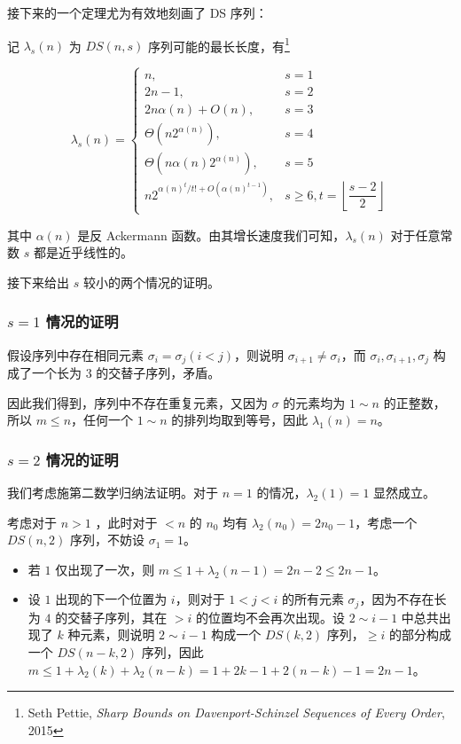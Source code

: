 \documentclass{noithesis}
\begin{document}
接下来的一个定理尤为有效地刻画了 DS 序列：

\begin{Thm}
记 $\lambda_s(n)$ 为 $DS(n, s)$ 序列可能的最长长度，有\footnote{Seth Pettie, \emph{Sharp Bounds on Davenport-Schinzel Sequences of Every Order}, 2015}

$$
\lambda_s(n) = \begin{cases}
n, & s = 1 \\
2n - 1, & s = 2\\
2n\alpha(n) + O(n), & s = 3\\
\Theta(n 2^{\alpha(n)}), & s = 4\\
\Theta(n\alpha(n) 2^{\alpha(n)}), & s = 5\\
n2^{\alpha(n)^t/t! + O(\alpha(n)^{t-1})}, & s\ge 6, t = \left\lfloor \dfrac {s-2}2\right \rfloor
\end{cases}
$$
\end{Thm}

其中 $\alpha(n)$ 是反 Ackermann 函数。由其增长速度我们可知，$\lambda_s(n)$ 对于任意常数 $s$ 都是近乎线性的。

接下来给出 $s$ 较小的两个情况的证明。

\subsubsection{$s = 1$ 情况的证明}

假设序列中存在相同元素 $\sigma_i = \sigma_j (i < j)$，则说明 $\sigma_{i+1} \neq \sigma_i$，而 $\sigma_i, \sigma_{i+1}, \sigma_j$ 构成了一个长为 $3$ 的交替子序列，矛盾。

因此我们得到，序列中不存在重复元素，又因为 $\sigma$ 的元素均为 $1\sim n$ 的正整数，所以 $m\le n$，任何一个 $1\sim n$ 的排列均取到等号，因此 $\lambda_1(n) = n$。

\subsubsection{$s = 2$ 情况的证明}

我们考虑施第二数学归纳法证明。对于 $n=1$ 的情况，$\lambda_2(1) = 1$ 显然成立。

考虑对于 $n>1$ ，此时对于 $<n$ 的 $n_0$ 均有 $\lambda_2(n_0) = 2n_0 - 1$，考虑一个 $DS(n, 2)$ 序列，不妨设 $\sigma_1 = 1$。

\begin{itemize}
\item 若 $1$ 仅出现了一次，则 $m\le 1 + \lambda_2(n - 1) = 2n - 2 \le 2n - 1$。
\item 设 $1$ 出现的下一个位置为 $i$，则对于 $1 < j < i$ 的所有元素 $\sigma_j$，因为不存在长为 $4$ 的交替子序列，其在 $>i$ 的位置均不会再次出现。设 $2\sim i - 1$ 中总共出现了 $k$ 种元素，则说明 $2\sim i - 1$ 构成一个 $DS(k, 2)$ 序列，$\ge i$ 的部分构成一个 $DS(n - k, 2)$ 序列，因此 $m\le 1 + \lambda_2(k) + \lambda_2(n - k) = 1 + 2k-1 + 2(n-k) - 1 = 2n - 1$。
\end{itemize}
\end{document}
